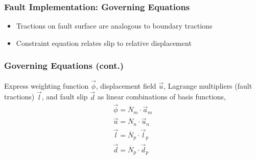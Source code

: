 \documentclass{beamer}
\newcommand{\tensor}[1]{\overline{#1}}
\begin{document}
\begin{frame}[fragile]
  \frametitle{Fault Implementation: Governing Equations}

  \begin{itemize}
  \item Tractions on fault surface are analogous to boundary tractions
  \item Constraint equation relates slip to relative displacement
  \end{itemize}

\end{frame}


\begin{frame}
  \frametitle{Governing Equations (cont.)}
  \summary{}

  Express weighting function $\vec{\phi}$, displacement field
  $\vec{u}$, Lagrange multipliers (fault tractions) $\vec{l}$, and
  fault slip $\vec{d}$ as
  linear combinations of basis functions,
  \begin{gather}
    \vec{\phi} = \tensor{N}_m \cdot \vec{a}_m \\
    \vec{u} = \tensor{N}_n \cdot \vec{u}_n \\
    \vec{l} = \tensor{N}_p \cdot \vec{l}_p \\
    \vec{d} = \tensor{N}_p \cdot \vec{d}_p
  \end{gather}

\end{frame}
\end{document}
